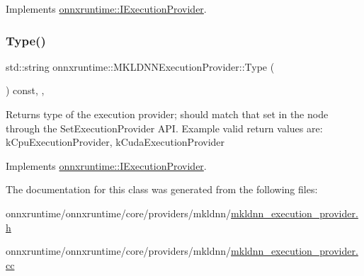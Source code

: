 Implements \mbox{\hyperlink{classonnxruntime_1_1IExecutionProvider_a83caf9a8da9fcbc4e7fdc891055d664d}{onnxruntime\+::\+I\+Execution\+Provider}}.

\mbox{\label{classonnxruntime_1_1MKLDNNExecutionProvider_a9d13e248253f882664260bb3e7d093b9}} 
\subsubsection{\texorpdfstring{Type()}{Type()}}
{\footnotesize\ttfamily std\+::string onnxruntime\+::\+M\+K\+L\+D\+N\+N\+Execution\+Provider\+::\+Type (\begin{DoxyParamCaption}{ }\end{DoxyParamCaption}) const\hspace{0.3cm}{\ttfamily [inline]}, {\ttfamily [override]}, {\ttfamily [virtual]}}

\begin{DoxyReturn}{Returns}
type of the execution provider; should match that set in the node through the Set\+Execution\+Provider A\+PI. Example valid return values are\+: k\+Cpu\+Execution\+Provider, k\+Cuda\+Execution\+Provider 
\end{DoxyReturn}


Implements \mbox{\hyperlink{classonnxruntime_1_1IExecutionProvider_a6bfeb7af172299bcc6083a418b01fac1}{onnxruntime\+::\+I\+Execution\+Provider}}.



The documentation for this class was generated from the following files\+:\begin{DoxyCompactItemize}
\item 
onnxruntime/onnxruntime/core/providers/mkldnn/\mbox{\hyperlink{mkldnn__execution__provider_8h}{mkldnn\+\_\+execution\+\_\+provider.\+h}}\item 
onnxruntime/onnxruntime/core/providers/mkldnn/\mbox{\hyperlink{mkldnn__execution__provider_8cc}{mkldnn\+\_\+execution\+\_\+provider.\+cc}}\end{DoxyCompactItemize}
